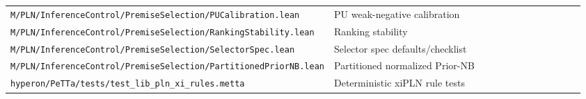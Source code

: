 \documentclass[11pt]{article}
\newcommand{\lpath}[1]{\texttt{\nolinkurl{#1}}}
\begin{document}
\begin{scriptsize}
\begin{longtable}{@{}L{0.48\linewidth}L{0.48\linewidth}@{}}
\lpath{M/PLN/InferenceControl/PremiseSelection/PUCalibration.lean}
  & PU weak-negative calibration \\
\lpath{M/PLN/InferenceControl/PremiseSelection/RankingStability.lean}
  & Ranking stability \\
\lpath{M/PLN/InferenceControl/PremiseSelection/SelectorSpec.lean}
  & Selector spec defaults/checklist \\
\lpath{M/PLN/InferenceControl/PremiseSelection/PartitionedPriorNB.lean}
  & Partitioned normalized Prior-NB \\
\lpath{hyperon/PeTTa/tests/test_lib_pln_xi_rules.metta}
  & Deterministic xiPLN rule tests \\
\bottomrule
\end{longtable}
\end{scriptsize}
\end{document}
